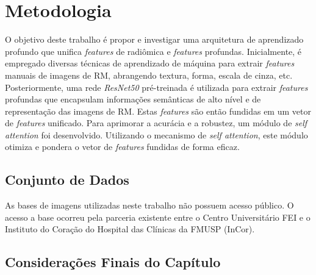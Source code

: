 \chapter{Metodologia} 
\label{chap:metodologia}

O objetivo deste trabalho é propor e investigar uma arquitetura de aprendizado profundo que unifica \textit{features} de radiômica e \textit{features} profundas. Inicialmente, é empregado diversas técnicas de aprendizado de máquina para extrair \textit{features} manuais de imagens de RM, abrangendo textura, forma, escala de cinza, etc. Posteriormente, uma rede \textit{ResNet50} pré-treinada é utilizada para extrair \textit{features} profundas que encapsulam informações semânticas de alto nível e de representação das imagens de RM. Estas \textit{features} são então fundidas em um vetor de \textit{features} unificado. Para aprimorar a acurácia e a robustez, um módulo de \textit{self attention} foi desenvolvido. Utilizando o mecanismo de \textit{self attention}, este módulo otimiza e pondera o vetor de \textit{features} fundidas de forma eficaz.

\section{Conjunto de Dados}
As bases de imagens utilizadas neste trabalho não possuem acesso público. O acesso
a base ocorreu pela parceria existente entre o Centro Universitário FEI e o Instituto do Coração do Hospital das Clínicas da FMUSP (InCor).


\section{Considerações Finais do Capítulo}
\label{subsec:rcond_cap_4}

\lipsum[1-4]